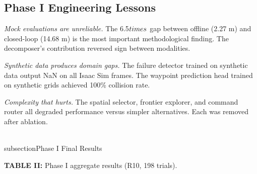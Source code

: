 \documentclass[conference]{IEEEtran}
\begin{document}
\subsection{Phase I Engineering Lessons}\label{c.-phase-i-engineering-lessons}

\emph{Mock evaluations are unreliable.} The 6.5$\\times$ gap between offline
(2.27 m) and closed-loop (14.68 m) is the most important methodological
finding. The decomposer's contribution reversed sign between modalities.

\emph{Synthetic data produces domain gaps.} The failure detector trained
on synthetic data output NaN on all Isaac Sim frames. The waypoint
prediction head trained on synthetic grids achieved 100\% collision
rate.

\emph{Complexity that hurts.} The spatial selector, frontier explorer,
and command router all degraded performance versus simpler alternatives.
Each was removed after ablation.

\\subsection{Phase I Final Results}\label{d.-phase-i-final-results}

\textbf{TABLE II:} Phase I aggregate results (R10, 198 trials).
\end{document}
